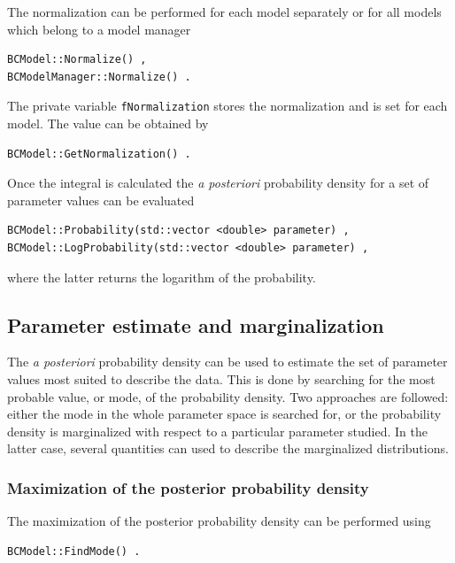 \documentclass[11pt, a4paper]{article}
\begin{document}
\noindent 
The normalization can be performed for each model separately or for
all models which belong to a model manager
%
\begin{verbatim}
BCModel::Normalize() ,
BCModelManager::Normalize() .
\end{verbatim} 

\noindent 
The private variable \verb|fNormalization| stores the normalization
and is set for each model. The value can be obtained by 
%
\begin{verbatim}
BCModel::GetNormalization() . 
\end{verbatim}

\noindent 
Once the integral is calculated the {\it a posteriori} probability
density for a set of parameter values can be evaluated
%
\begin{verbatim} 
BCModel::Probability(std::vector <double> parameter) , 
BCModel::LogProbability(std::vector <double> parameter) , 
\end{verbatim} 
%
where the latter returns the logarithm of the probability. 


\subsection{Parameter estimate and marginalization} 

The {\it a posteriori} probability density can be used to estimate the
set of parameter values most suited to describe the data. This is done
by searching for the most probable value, or mode, of the probability
density.  Two approaches are followed: either the mode in the whole
parameter space is searched for, or the probability density is
marginalized with respect to a particular parameter studied. In the
latter case, several quantities can used to describe the marginalized
distributions.


\subsubsection{Maximization of the posterior probability density} 

The maximization of the posterior probability density can be performed
using
%
\begin{verbatim} 
BCModel::FindMode() . 
\end{verbatim} 
\end{document}
